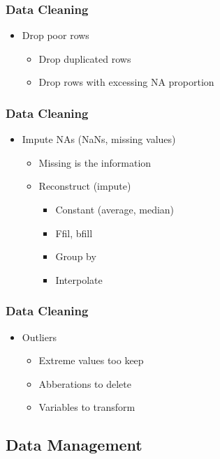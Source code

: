 \begin{frame}\frametitle{Data Cleaning}
   \begin{itemize}
      \item Drop poor rows
      \begin{itemize}
         \item Drop duplicated rows
         \item Drop rows with excessing NA proportion
      \end{itemize}
   \end{itemize}
\end{frame}


\begin{frame}\frametitle{Data Cleaning}
   \begin{itemize}
      \item Impute NAs (NaNs, missing values)
      \begin{itemize}
         \item Missing is the information
         \item Reconstruct (impute)
         \begin{itemize}
            \item Constant (average, median)
            \item Ffil, bfill
            \item Group by
            \item Interpolate
         \end{itemize}
      \end{itemize}
   \end{itemize}
\end{frame}


\begin{frame}\frametitle{Data Cleaning}
   \begin{itemize}
      \item Outliers
      \begin{itemize}
         \item Extreme values too keep
         \item Abberations to delete
         \item Variables to transform
      \end{itemize}
   \end{itemize}
\end{frame}


\subsection{Data Management}



